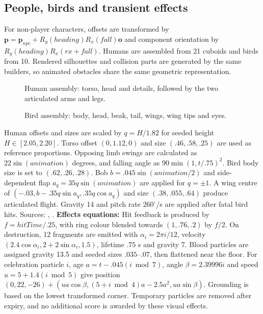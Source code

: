 \subsection{People, birds and transient effects}
For non-player characters, offsets are transformed by $\mathbf p=\mathbf p_{npc}+R_y(heading)R_x(fall)\mathbf o$ and component orientation by $R_y(heading)R_x(rx+fall)$. Humans are assembled from 21 cuboids and birds from 10. Rendered silhouettes and collision parts are generated by the same builders, so animated obstacles share the same geometric representation.
\begin{figure}[htbp]

\caption{Human assembly: torso, head and details, followed by the two articulated arms and legs.}
\end{figure}
\begin{figure}[htbp]

\caption{Bird assembly: body, head, beak, tail, wings, wing tips and eyes.}
\end{figure}
Human offsets and sizes are scaled by $q=H/1.82$ for seeded height $H\in[2.05,2.20]$. Torso offset $(0,1.12,0)$ and size $(.46,.58,.25)$ are used as reference proportions. Opposing limb swings are calculated as $22\sin(animation)$ degrees, and falling angle as $90\min(1,t/.75)^2$. Bird body size is set to $(.62,.26,.28)$. Bob $b=.045\sin(animation/2)$ and side-dependent flap $a_q=35q\sin(animation)$ are applied for $q=\pm1$. A wing centre of $(-.03,b-.35q\sin a_q,.35q\cos a_q)$ and size $(.38,.055,.64)$ produce articulated flight. Gravity 14 and pitch rate $260^\circ$/s are applied after fatal bird hits. Sources: , .
\textbf{Effects equations:} Hit feedback is produced by $f=hitTime/.25$, with ring colour blended towards $(1,.76,.2)$ by $f/2$. On destruction, 12 fragments are emitted with $\alpha_i=2\pi i/12$, velocity $(2.4\cos\alpha_i,2+2\sin\alpha_i,1.5)$, lifetime $.75$ s and gravity 7. Blood particles are assigned gravity 13.5 and seeded sizes $.035$--$.07$, then flattened near the floor. For celebration particle $i$, age $a=t-.045(i\bmod7)$, angle $\beta=2.39996i$ and speed $u=5+1.4(i\bmod5)$ give position $(0,22,-26)+(ua\cos\beta,(5+i\bmod4)a-2.5a^2,ua\sin\beta)$. Grounding is based on the lowest transformed corner. Temporary particles are removed after expiry, and no additional score is awarded by these visual effects.

